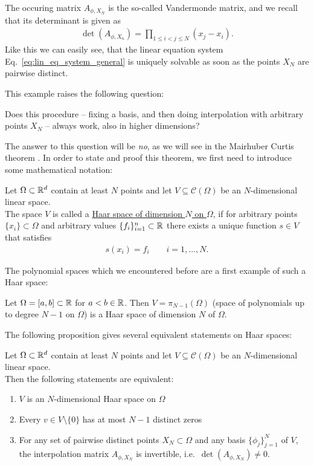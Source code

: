 The occuring matrix $A_{\phi, X_N}$ is the so-called Vandermonde matrix, and we recall that its determinant is given as
\begin{align*}
\det(A_{\phi, X_n}) = \prod_{1 \leq i < j \leq N} (x_j - x_i).
\end{align*}
Like this we can easily see, that the linear equation system Eq.~\eqref{eq:lin_eq_system_general} is uniquely solvable as soon as the points $X_N$ are pairwise distinct.

This example raises the following question:
\begin{question}
\label{question:01}
Does this procedure -- fixing a basis, and then doing interpolation with arbitrary points $X_N$ -- always work, also in higher dimensions? 
\end{question}

The answer to this question will be \textit{no}, as we will see in the Mairhuber Curtis theorem .
In order to state and proof this theorem, we first need to introduce some mathematical notation:

\begin{definition}
	Let $\Omega \subset \mathbb{R}^d$ contain at least $N$ points and let $V \subseteq \mathcal{C}(\Omega)$ be an $N$-dimensional linear space. \\
	The space $V$ is called a \underline{Haar space of dimension $N$ on $\Omega$},
	if for arbitrary points $\{ x_i \} \subset \Omega$ and arbitrary values $\{ f_i \}_{i=1}^n \subset \mathbb{R}$ there exists a unique function $s \in V$ that satisfies 
	\begin{align*}
	s(x_i) = f_i \qquad i=1, ..., N.
	\end{align*}
\end{definition}

The polynomial spaces which we encountered before are a first example of such a Haar space:

\begin{example}
Let $\Omega = [a, b] \subset \mathbb{R}$ for $a < b \in \mathbb{R}$. 
Then $V = \pi_{N-1}(\Omega)$ (space of polynomials up to degree $N-1$ on $\Omega$) is a Haar space of dimension $N$ of $\Omega$.
\end{example}

The following proposition gives several equivalent statements on Haar spaces:

\begin{prop}
\label{prop:haar_space}
Let $\Omega \subset \mathbb{R}^d$ contain at least $N$ points and let $V \subseteq \mathcal{C}(\Omega)$ be an $N$-dimensional linear space. \\
Then the following statements are equivalent:
\begin{enumerate}
\item $V$ is an $N$-dimensional Haar space on $\Omega$
\item Every $v \in V \setminus \{ 0 \}$ has at most $N-1$ distinct zeros
\item For any set of pairwise distinct points $X_N \subset \Omega$ and any basis $\{ \phi_j \}_{j=1}^N$ of $V$, 
the interpolation matrix $A_{\phi, X_N}$ is invertible, i.e.\ $\det(A_{\phi, X_N}) \neq 0$.
\end{enumerate}
\end{prop}


